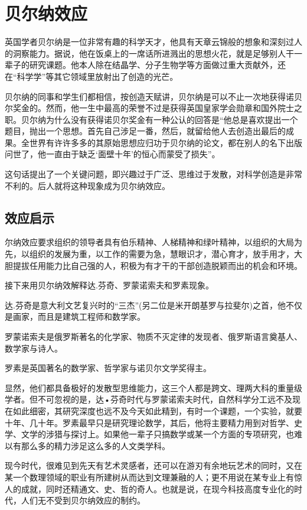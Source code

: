 \documentclass[11pt]{ctexart}
\begin{document}
\section{贝尔纳效应}
\label{sec-9}


英国学者贝尔纳是一位非常有趣的科学天才，他具有天章云锦般的想象和深刻过人的洞察能力。据说，他在饭桌上的一席话所进溅出的思想火花，就是足够别人干一辈子的研究课题。他本人除在结晶学、分子生物学等方面做过重大贡献外，还在“科学学”等其它领域里放射出了创造的光芒。

贝尔纳的同事和学生们都相信，按创造天赋讲，贝尔纳是可以不止一次地获得诺贝尔奖金的。然而，他一生中最高的荣誉不过是获得英国皇家学会勋章和国外院士之职。贝尔纳为什么没有获得诺贝尔奖金有一种公认的回答是“他总是喜欢提出一个题目，抛出一个思想。首先自己涉足一番，然后，就留给他人去创造出最后的成果。全世界有许许多多的其原始思想应归功于贝尔纳的论文，都在别人的名下出版问世了，他一直由于缺乏‘面壁十年’的恒心而蒙受了损失”。

这句话提出了一个关键问题，即兴趣过于广泛、思维过于发散，对科学创造是非常不利的。后人就将这种现象成为贝尔纳效应。
\subsection{效应启示}
\label{sec-9-1}


尔纳效应要求组织的领导者具有伯乐精神、人梯精神和绿叶精神，以组织的大局为先，以组织的发展为重，以工作的需要为急，慧眼识才，潜心育才，放手用才，大胆提拔任用能力比自己强的人，积极为有才干的干部创造脱颖而出的机会和环境。

接下来用贝尔纳效解释达.芬奇、罗蒙诺索夫和罗素现象。

达.芬奇是意大利文艺复兴时的“三杰”(另二位是米开朗基罗与拉斐尔)之首，他不仅是画家，而且是建筑工程师和数学家。

罗蒙诺索夫是俄罗斯著名的化学家、物质不灭定律的发现者、俄罗斯语言奠基人、数学家与诗人。

罗素是英国著名的数学家、哲学家与诺贝尔文学奖得主。

显然，他们都具备极好的发散型思维能力，这三个人都是跨文、理两大科的重量级学者。但不可忽视的是，达•芬奇时代与罗蒙诺索夫时代，自然科学分工远不及现在如此细密，其研究深度也远不及今天如此精到，有时一个课题，一个实验，就要十年、几十年。罗素最早只是研究理论数学，其后，他将主要精力用到对哲学、史学、文学的涉猎与探讨上。如果他一辈子只搞数学或某一个方面的专项研究，也难以有那么多的精力涉足这么多的人文类学科。

现今时代，很难见到先天有艺术灵感者，还可以在游刃有余地玩艺术的同时，又在某一个数理领域的职业有所建树从而达到文理兼融的人；更不用说在某专业上有惊人的成就，同时还精通文、史、哲的奇人。也就是说，在现今科技高度专业化的时代，人们无不受到贝尔纳效应的制约。
\end{document}
